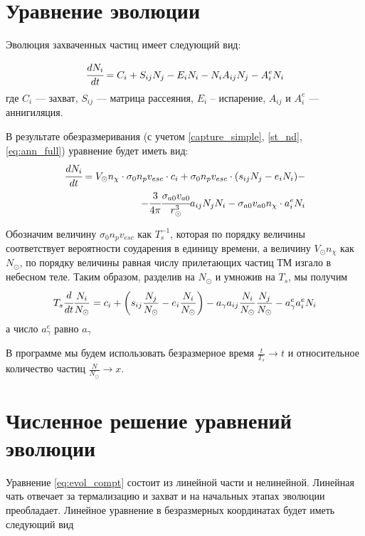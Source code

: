 \section{Уравнение эволюции}

Эволюция захваченных частиц имеет следующий вид:

\begin{equation}
	\cfrac{d N_i}{d t} = C_i + S_{ij}N_j - E_i N_i - N_i A_{ij} N_j - A^e_{i}N_i
\end{equation}
где $C_i$ --- захват,  $S_{ij}$ --- матрица рассеяния, $E_i$ -- испарение, $A_{ij}$ и $A^e_{i}$ --- аннигиляция.

В результате обезразмеривания (с учетом \ref{capture_simple}, \ref{st_nd}, \ref{eq:ann_full}) уравнение будет иметь вид:
\begin{equation*}
\begin{split}
	\cfrac{d N_i}{d t} = V_{\odot}n_{\chi} \cdot \sigma_{0} n_p v_{esc} \cdot c_{i} + \sigma_{0} n_p v_{esc} \cdot (s_{ij}N_j - e_i N_i) -\\
	-\cfrac{3}{4\pi}\cfrac{\sigma_{a0} v_{a0}}{r_{\odot}^3} a_{ij} N_j N_i-
	\sigma_{a0} v_{a0} n_{\chi} \cdot a^e_i N_i
\end{split}
\end{equation*}

Обозначим величину $\sigma_{0} n_p v_{esc}$ как $T_s^{-1}$, которая по порядку величины соответствует вероятности соударения в единицу времени, а величину $V_{\odot}n_{\chi}$ как $N_{\odot}$, по порядку величины равная числу прилетающих частиц ТМ изгало в небесном теле.
Таким образом, разделив на $N_{\odot}$ и умножив на $T_s$, мы получим
\begin{equation}
	\label{eq:evol_compt}
	T_s\cfrac{d }{d t}\frac{N_i}{N_{\odot}} = c_{i} + \left(s_{ij} \frac{N_j}{N_{\odot}} - e_i \frac{N_i}{N_{\odot}}\right) - a_{\gamma} a_{ij} \frac{N_i}{N_{\odot}} \frac{N_j}{N_{\odot}} -  a^e_{\gamma} a^e_i N_i
\end{equation}
а число $a^e_{\gamma}$ равно $a_{\gamma}$

В программе мы будем использовать безразмерное время $\frac{t}{T_s} \rightarrow t$ и относительное количество частиц $\frac{N}{N_{\odot}}\rightarrow x$. 


\section{Численное решение уравнений эволюции}

Уравнение \ref{eq:evol_compt} состоит из линейной части и нелинейной. Линейная чать отвечает за термализацию и захват и на начальных этапах эволюции преобладает. Линейное уравнение в безразмерных координатах будет иметь следующий вид


